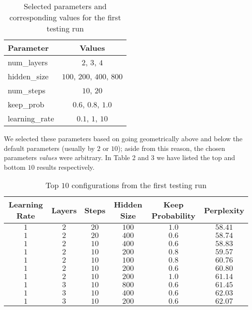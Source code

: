 \documentclass[a4paper]{article}
\begin{document}
\begin{table}[h]
 \caption{Selected parameters and corresponding values for the first testing run}
 \label{table}
 \begin{center}
  \begin{tabular}{l|c}
    \hline \hline
    Parameter & Values \\
    \hline
        num\_layers & $2$, $3$, $4$ \\
        hidden\_size & $100$, $200$, $400$, $800$ \\
        num\_steps & $10$, $20$ \\
        keep\_prob & $0.6$, $0.8$, $1.0$ \\
        learning\_rate & $0.1$, $1$, $10$ \\
    \hline
  \end{tabular}
 \end{center}
\end{table}

We selected these parameters based on going geometrically above and below
the default parameters (usually by $2$ or $10$); aside from this reason, the
chosen parameters \textit{values}  were arbitrary.
In Table 2 and 3 we have listed the top and bottom $10$ results respectively.


\begin{table}[h]
 \caption{Top $10$ configurations from the first testing run}
 \label{table}
 \begin{center}
  \begin{tabular}{ccccc|c}
    \hline \hline
    Learning Rate & Layers & Steps & Hidden Size & Keep Probability & Perplexity \\
    \hline
        $1$ & $2$ & $20$ & $100$ & $1.0$ & $58.41$ \\
        $1$ & $2$ & $20$ & $400$ & $0.6$ & $58.74$ \\
        $1$ & $2$ & $10$ & $400$ & $0.6$ & $58.83$ \\
        $1$ & $2$ & $10$ & $200$ & $0.8$ & $59.57$ \\
        $1$ & $2$ & $10$ & $100$ & $0.8$ & $60.76$ \\
        $1$ & $2$ & $10$ & $200$ & $0.6$ & $60.80$ \\
        $1$ & $2$ & $10$ & $200$ & $1.0$ & $61.14$ \\
        $1$ & $3$ & $10$ & $800$ & $0.6$ & $61.45$ \\
        $1$ & $3$ & $10$ & $400$ & $0.6$ & $62.03$ \\
        $1$ & $3$ & $10$ & $200$ & $0.6$ & $62.07$ \\
    \hline
  \end{tabular}
 \end{center}
\end{table}
\end{document}
